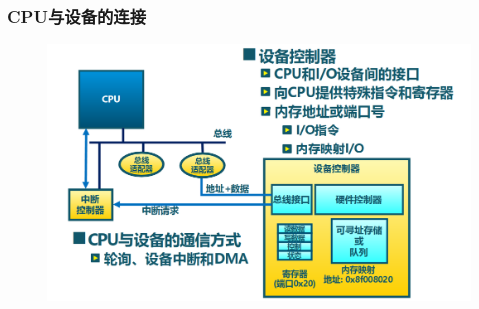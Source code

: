 \begin{frame}[fragile]
    \frametitle{CPU与设备的连接}
    \begin{figure}
        \includegraphics[width=0.8\linewidth]{figs/cpu-connect-dev.png}
    \end{figure}
\end{frame}
